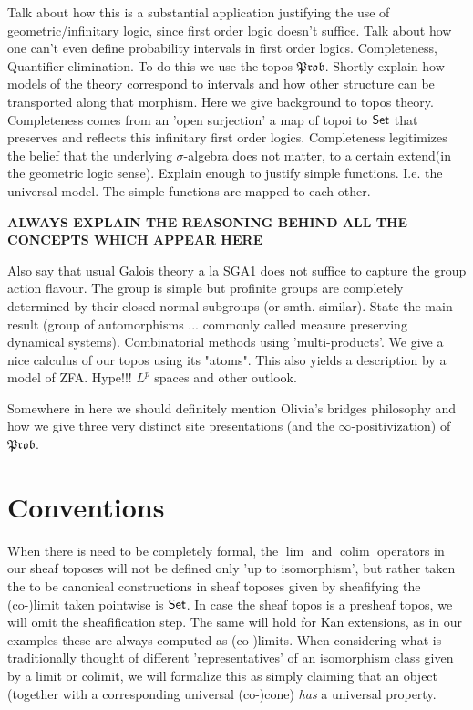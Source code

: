 \documentclass[a4paper]{amsproc}
\theoremstyle{plain}
\theoremstyle{definition}
\theoremstyle{remark}
\numberwithin{equation}{section}
\DeclareMathOperator*{\limit}{lim}
\DeclareMathOperator*{\colim}{colim}
\newcommand{\Set}{\textup{\textsf{Set}}}
\newcommand{\Prob}{\mathfrak{Prob}}
\begin{document}
\indent Talk about how this is a substantial application justifying the use of geometric/infinitary logic, since first order logic doesn't suffice. Talk about how one can't even define probability intervals in first order logics. Completeness, Quantifier elimination.\newline
\indent To do this we use the topos $\Prob$. Shortly explain how models of the theory correspond to intervals and how other structure can be transported along that morphism. Here we give background to topos theory. Completeness comes from an 'open surjection' a map of topoi to $\Set$ that preserves and reflects this infinitary first order logics. Completeness legitimizes the belief that the underlying $\sigma$-algebra does not matter, to a certain extend(in the geometric logic sense). Explain enough to justify simple functions. I.e. the universal model. The simple functions are mapped to each other.
\begin{center}\textbf{ALWAYS EXPLAIN THE REASONING BEHIND ALL THE CONCEPTS WHICH APPEAR HERE}\end{center}
Also say that usual Galois theory a la SGA1 does not suffice to capture the group action flavour. The group is simple but profinite groups are completely determined by their closed normal subgroups (or smth. similar). State the main result (group of automorphisms ... commonly called measure preserving dynamical systems).\newline
\indent Combinatorial methods using 'multi-products'. We give a nice calculus of our topos using its "atoms". This also yields a description by a model of ZFA. \newline
\indent Hype!!! $L^p$ spaces and other outlook.

Somewhere in here we should definitely mention Olivia's bridges philosophy and how we give three very distinct site presentations (and the $\infty$-positivization) of $\Prob$.


\section{Conventions} \label{conventions}

When there is need to be completely formal, the $\limit$ and $\colim$ operators in our sheaf toposes will not be defined only 'up to isomorphism', but rather taken the to be canonical constructions in sheaf toposes given by sheafifying the (co-)limit taken pointwise is $\Set$. In case the sheaf topos is a presheaf topos, we will omit the sheafification step. The same will hold for Kan extensions, as in our examples these are always computed as (co-)limits. When considering what is traditionally thought of different 'representatives' of an isomorphism class given by a limit or colimit, we will formalize this as simply claiming that an object (together with a corresponding universal (co-)cone) \emph{has} a universal property.
\end{document}
